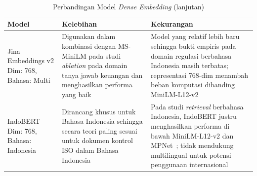 \begin{table}[H]
\centering
\small
\caption{Perbandingan Model \textit{Dense Embedding} (lanjutan)}
\label{tab:perbandingan_dense_lanjutan}
\begin{tabular}{|p{3.2cm}|p{5.6cm}|p{5.6cm}|}
\hline
\textbf{Model} & \textbf{Kelebihan} & \textbf{Kekurangan} \\
\hline
Jina Embeddings v2 \newline Dim: 768, Bahasa: Multi &
Digunakan dalam kombinasi dengan MS-MiniLM pada studi \textit{ablation} pada domain tanya jawab keuangan dan menghasilkan performa yang baik~\cite{ravishankar2025hybrid} &
Model yang relatif lebih baru sehingga bukti empiris pada domain regulasi berbahasa Indonesia masih terbatas; representasi 768-dim menambah beban komputasi dibanding MiniLM-L12-v2 \\
\hline
IndoBERT \newline Dim: 768, Bahasa: Indonesia &
Dirancang khusus untuk Bahasa Indonesia sehingga secara teori paling sesuai untuk dokumen kontrol ISO dalam Bahasa Indonesia &
Pada studi \textit{retrieval} berbahasa Indonesia, IndoBERT justru menghasilkan performa di bawah MiniLM-L12-v2 dan MPNet~\cite{maryamah2024mpnet}; tidak mendukung multilingual untuk potensi penggunaan internasional \\
\hline
\end{tabular}
\end{table}

